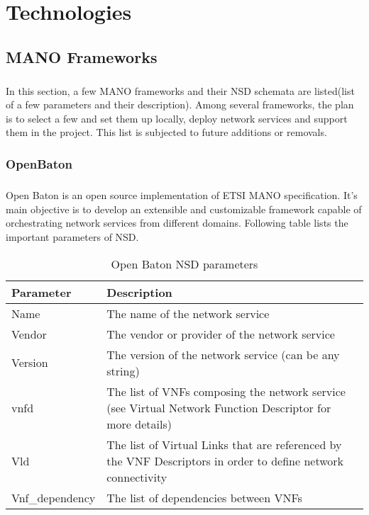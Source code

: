 \chapter{Technologies}
\label{ch:Technologies}
\section{MANO Frameworks}
\paragraph{}
In this section, a few MANO frameworks and their NSD schemata are listed(list of a few parameters and their description). Among several frameworks, the plan is to select a few and set them up locally, deploy network services and support them in the project. This list is subjected to future additions or removals.
\subsection{OpenBaton}
\paragraph{}
Open Baton is an open source implementation of ETSI MANO specification. It's main objective is to develop an extensible and customizable framework capable of orchestrating network services from different domains\cite{openBaton}. Following table lists the important parameters of NSD\cite{openBatonSchemaDocumentation}. 
    \begin{table}[h]
        \centering
        \begin{tabular}{ |p{4cm}|p{10cm}|}
            \hline
            \textbf{Parameter} & \textbf{Description} \\
            \hline
             
             Name & The name of the network service \\
             \hline
             Vendor & The vendor or provider of the network service \\
             \hline
             Version & The version of the network service (can be any string) \\
             \hline
             vnfd & The list of VNFs composing the network service (see Virtual Network Function Descriptor for more details) \\
             \hline
             Vld & The list of Virtual Links that are referenced by the VNF Descriptors in order to define network connectivity \\
             \hline
             Vnf\_dependency & The list of dependencies between VNFs\\
             \hline
        \end{tabular}
        \caption{Open Baton NSD parameters}
        \label{tab:OpenBatonSchema}
    \end{table}
